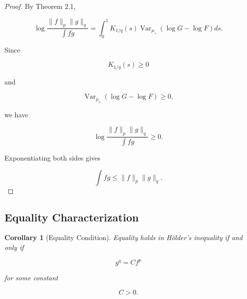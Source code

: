 \documentclass[11pt]{amsart}
\newtheorem{corollary}[theorem]{Corollary}
\begin{document}
\begin{proof}

By Theorem 2.1,

\[
\log
\frac{
\|f\|_p\|g\|_q
}{
\int fg
}
=
\int_0^1
K_{1/q}(s)
\operatorname{Var}_{\mu_s}
(
\log G-\log F
)
ds .
\]

Since

\[
K_{1/q}(s)\geq0
\]

and

\[
\operatorname{Var}_{\mu_s}
(
\log G-\log F
)
\geq0 ,
\]

we have

\[
\log
\frac{
\|f\|_p\|g\|_q
}{
\int fg
}
\geq0 .
\]

Exponentiating both sides gives

\[
\int fg
\leq
\|f\|_p\|g\|_q .
\]

\end{proof}



\subsection{Equality Characterization}


\begin{corollary}[Equality Condition]
Equality holds in Hölder's inequality if and only if

\[
g^q=Cf^p
\]

for some constant

\[
C>0 .
\]

\end{corollary}
\end{document}
